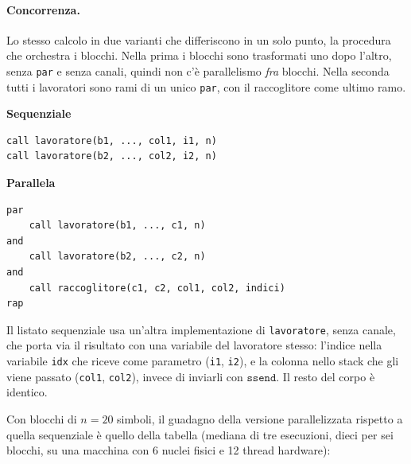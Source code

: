 \paragraph{Concorrenza.} Lo stesso calcolo in due varianti che differiscono in
un solo punto, la procedura che orchestra i blocchi. Nella prima i blocchi
sono trasformati uno dopo l'altro, senza \texttt{par} e senza canali, quindi
non c'è parallelismo \emph{fra} blocchi. Nella seconda tutti i lavoratori sono
rami di un unico \texttt{par}, con il raccoglitore come ultimo ramo.
\begin{center}
\begin{minipage}[t]{0.48\textwidth}
\centering
\textbf{Sequenziale}
\begin{lstlisting}
call lavoratore(b1, ..., col1, i1, n)
call lavoratore(b2, ..., col2, i2, n)
\end{lstlisting}
\end{minipage}
\hfill
\begin{minipage}[t]{0.48\textwidth}
\centering
\textbf{Parallela}
\begin{lstlisting}
par
    call lavoratore(b1, ..., c1, n)
and
    call lavoratore(b2, ..., c2, n)
and
    call raccoglitore(c1, c2, col1, col2, indici)
rap
\end{lstlisting}
\end{minipage}
\end{center}

\noindent
Il listato sequenziale usa un'altra implementazione di \texttt{lavoratore}, senza
canale, che porta via il risultato con una variabile del lavoratore stesso: l'indice
nella variabile \texttt{idx} che riceve come parametro (\texttt{i1}, \texttt{i2}), e
la colonna nello stack che gli viene passato (\texttt{col1}, \texttt{col2}), invece di
inviarli con $\mathtt{ssend}$. Il resto del corpo è identico.

Con blocchi di $n=20$ simboli, il guadagno della versione parallelizzata
rispetto a quella sequenziale è quello della tabella (mediana di tre
esecuzioni, dieci per sei blocchi, su una macchina con 6 nuclei fisici e 12
thread hardware):

